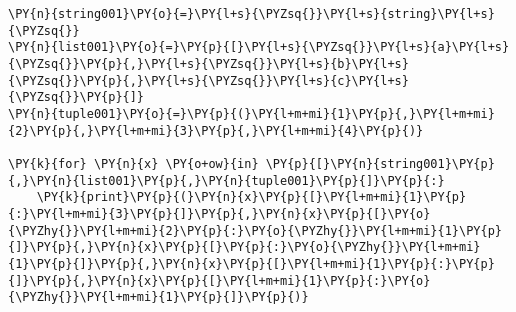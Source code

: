 \begin{Verbatim}[commandchars=\\\{\}]
\PY{n}{string001}\PY{o}{=}\PY{l+s}{\PYZsq{}}\PY{l+s}{string}\PY{l+s}{\PYZsq{}}
\PY{n}{list001}\PY{o}{=}\PY{p}{[}\PY{l+s}{\PYZsq{}}\PY{l+s}{a}\PY{l+s}{\PYZsq{}}\PY{p}{,}\PY{l+s}{\PYZsq{}}\PY{l+s}{b}\PY{l+s}{\PYZsq{}}\PY{p}{,}\PY{l+s}{\PYZsq{}}\PY{l+s}{c}\PY{l+s}{\PYZsq{}}\PY{p}{]}
\PY{n}{tuple001}\PY{o}{=}\PY{p}{(}\PY{l+m+mi}{1}\PY{p}{,}\PY{l+m+mi}{2}\PY{p}{,}\PY{l+m+mi}{3}\PY{p}{,}\PY{l+m+mi}{4}\PY{p}{)}

\PY{k}{for} \PY{n}{x} \PY{o+ow}{in} \PY{p}{[}\PY{n}{string001}\PY{p}{,}\PY{n}{list001}\PY{p}{,}\PY{n}{tuple001}\PY{p}{]}\PY{p}{:}
    \PY{k}{print}\PY{p}{(}\PY{n}{x}\PY{p}{[}\PY{l+m+mi}{1}\PY{p}{:}\PY{l+m+mi}{3}\PY{p}{]}\PY{p}{,}\PY{n}{x}\PY{p}{[}\PY{o}{\PYZhy{}}\PY{l+m+mi}{2}\PY{p}{:}\PY{o}{\PYZhy{}}\PY{l+m+mi}{1}\PY{p}{]}\PY{p}{,}\PY{n}{x}\PY{p}{[}\PY{p}{:}\PY{o}{\PYZhy{}}\PY{l+m+mi}{1}\PY{p}{]}\PY{p}{,}\PY{n}{x}\PY{p}{[}\PY{l+m+mi}{1}\PY{p}{:}\PY{p}{]}\PY{p}{,}\PY{n}{x}\PY{p}{[}\PY{l+m+mi}{1}\PY{p}{:}\PY{o}{\PYZhy{}}\PY{l+m+mi}{1}\PY{p}{]}\PY{p}{)}
\end{Verbatim}
